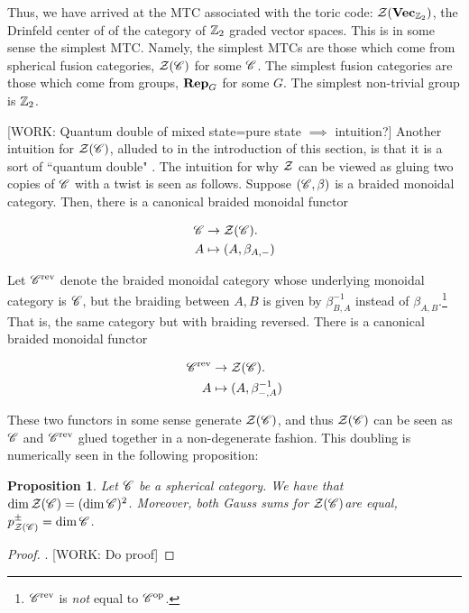 \documentclass{article}
\newtheorem{proposition}{Proposition}[section]
\theoremstyle{definition}
\numberwithin{figure}{section}
\begin{document}
Thus, we have arrived at the MTC associated with the toric code: $\mathcal{Z}(\bold{Vec}_{\mathbb{Z}_2})$, the Drinfeld center of of the category of $\mathbb{Z}_2$ graded vector spaces. This is in some sense the simplest MTC. Namely, the simplest MTCs are those which come from spherical fusion categories, $\mathcal{Z}(\mathscr{C})$ for some $\mathscr{C}$. The simplest fusion categories are those which come from groups, $\bold{Rep}_G$ for some $G$. The simplest non-trivial group is $\mathbb{Z}_2$.

[WORK: Quantum double of mixed state=pure state $\implies$ intuition?] Another intuition for $\mathcal{Z}(\mathscr{C})$, alluded to in the introduction of this section, is that it is a sort of ``quantum double" \cite{felice2017hopf}. The intuition for why $\mathcal{Z}$ can be viewed as gluing two copies of $\mathscr{C}$ with a twist is seen as follows. Suppose $(\mathscr{C},\beta)$ is a braided monoidal category. Then, there is a canonical braided monoidal functor

\begin{align*}
\mathscr{C} &\to \mathcal{Z}(\mathscr{C}).\\
A &\mapsto (A,\beta_{A,\--})
\end{align*}

Let $\mathscr{C}^{\text{rev}}$ denote the braided monoidal category whose underlying monoidal category is $\mathscr{C}$, but the braiding between $A,B$ is given by $\beta_{B,A}^{-1}$ instead of $\beta_{A,B}$.\footnote{$\mathscr{C}^{\text{rev}}$ is \textit{not} equal to $\mathscr{C}^{\mathrm{op}}$.} That is, the same category but with braiding reversed. There is a canonical braided monoidal functor

\begin{align*}
\mathscr{C}^{\text{rev}} &\to \mathcal{Z}(\mathscr{C}).\\
A &\mapsto (A,\beta^{-1}_{\--,A})
\end{align*}

These two functors in some sense generate $\mathcal{Z}(\mathscr{C})$, and thus $\mathcal{Z}(\mathscr{C})$ can be seen as $\mathscr{C}$ and $\mathscr{C}^{\text{rev}}$ glued together in a non-degenerate fashion. This doubling is numerically seen in the following proposition:

\begin{proposition} Let $\mathscr{C}$ be a spherical category. We have that $\dim \mathcal{Z}(\mathscr{C}) = (\dim \mathscr{C})^2$. Moreover, both Gauss sums for $\mathcal{Z}(\mathscr{C})$are equal, $p_{\mathcal{Z}(\mathscr{C})}^{\pm}=\dim \mathscr{C}$.
\end{proposition}
\begin{proof}. [WORK: Do proof]
\end{proof}
\end{document}
